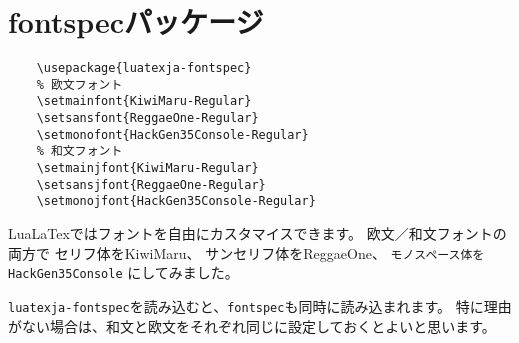 \section{fontspecパッケージ}

\begin{verbatim}
    \usepackage{luatexja-fontspec}
    % 欧文フォント
    \setmainfont{KiwiMaru-Regular}
    \setsansfont{ReggaeOne-Regular}
    \setmonofont{HackGen35Console-Regular}
    % 和文フォント
    \setmainjfont{KiwiMaru-Regular}
    \setsansjfont{ReggaeOne-Regular}
    \setmonojfont{HackGen35Console-Regular}
\end{verbatim}

LuaLaTexではフォントを自由にカスタマイスできます。
欧文／和文フォントの両方で
\textrm{セリフ体をKiwiMaru}、
\textsf{サンセリフ体をReggaeOne}、
\texttt{モノスペース体をHackGen35Console}
にしてみました。

\texttt{luatexja-fontspec}を読み込むと、\texttt{fontspec}も同時に読み込まれます。
特に理由がない場合は、和文と欧文をそれぞれ同じに設定しておくとよいと思います。
